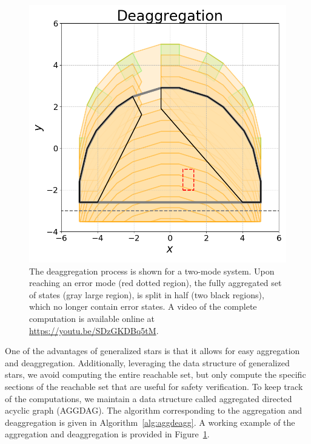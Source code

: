 \begin{figure}[h!]
\centerline{\includegraphics[width=0.7\columnwidth]{images/deagg.png}}
\caption{{\footnotesize The deaggregation process is shown for a two-mode system. Upon reaching an error mode (red dotted region), the fully aggregated set of states (gray large region), is split in half (two black regions), which no longer contain error states. A video of the complete computation is available online at \url{https://youtu.be/SDzGKDBq5tM}.}}
\label{fig:deagg}
\end{figure}


One of the advantages of generalized stars is that it allows for easy aggregation and deaggregation. 
%
Additionally, leveraging the data structure of generalized stars, we avoid computing the entire reachable set, but only compute the specific sections of the reachable set that are useful for safety verification.
%
To keep track of the computations, we maintain a data structure called aggregated directed acyclic graph (AGGDAG).
%
The algorithm corresponding to the aggregation and deaggregation is given in Algorithm~\ref{alg:aggdeagg}. A working example of the aggregation and deaggregation is provided in Figure~\ref{fig:deagg}.

